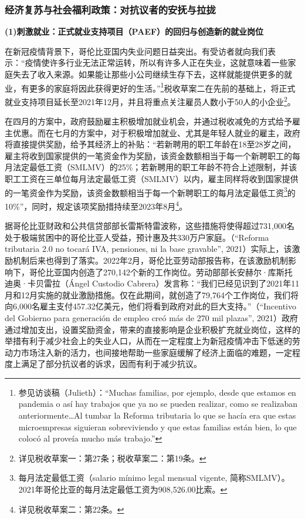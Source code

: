 \documentclass{phyasgn}\usepackage{nag}
\begin{document}
\subsubsection{经济复苏与社会福利政策：对抗议者的安抚与拉拢}
\textbf{(1)刺激就业：正式就业支持项目（PAEF）的回归与创造新的就业岗位}
\par 在新冠疫情背景下，哥伦比亚国内失业问题日益突出。有受访者就向我们表示：“疫情使许多行业无法正常运转，所以有许多人正在失业，这就意味着一些家庭失去了收入来源。如果能让那些小公司继续生存下去，这样就能提供更多的就业，有更多的家庭将因此获得更好的生活。”\footnote[29]{参见访谈稿（Julieth）：“Muchas familias, por ejemplo, desde que estamos en pandemia o así hay trabajos que ya no se pueden realizar, como se realizaban anteriormente…Al tumbar la Reforma tributaria lo que se hacía era que estas microempresas siguieran sobreviviendo y que estas familias están bien, lo que colocó al proveía mucho más trabajo.”}税收草案二在先前的基础上，将正式就业支持项目延长至2021年12月，并且将重点关注雇员人数小于50人的小企业\footnote[30]{详见税收草案一：第27条；税收草案二：第19条。}。
\par 在四月的方案中，政府鼓励雇主积极增加就业机会，并通过税收减免的方式给予雇主优惠。而在七月的方案中，对于积极增加就业、尤其是年轻人就业的雇主，政府将直接提供奖励，给予其经济上的补贴：“若新聘用的职工年龄在18至28岁之间，雇主将收到国家提供的一笔资金作为奖励，该资金数额相当于每一个新聘职工的每月法定最低工资（SMLMV）的25\%；若新聘用的职工年龄不符合上述限制，并该职工工资在三单位每月法定最低工资（SMLMV）以内，雇主同样将收到国家提供的一笔资金作为奖励，该资金数额相当于每一个新聘职工的每月法定最低工资\footnote[31]{每月法定最低工资（salario mínimo legal mensual vigente, 简称SMLMV）。2021年哥伦比亚的每月法定最低工资为908,526.00比索。}的10\%”，同时，规定该项奖励措持续至2023年8月\footnote[32]{详见税收草案二：第22条。}。
\par 据哥伦比亚财政和公共信贷部部长雷斯特雷波称，这些措施将使得超过731,000名处于极端贫困中的哥伦比亚人受益，预计惠及共330万户家庭。（“Reforma tributaria 2.0 no tocará IVA, pensiones, ni la base gravable”, 2021）实际上，该激励机制后来也得到了落实。2022年2月，哥伦比亚劳动部报告称，在该激励机制影响下，哥伦比亚国内创造了270,142个新的工作岗位。劳动部部长安赫尔·库斯托迪奥·卡贝雷拉（Ángel Custodio Cabrera）发言称：“我们已经见识到了2021年11月和12月实施的就业激励措施。仅在此期间，就创造了79,764个工作岗位，我们将向6,000名雇主支付457.32亿美元，他们将看到政府对此的巨大支持。”（“Incentivo del Gobierno para generación de empleo creó más de 270 mil plazas”, 2021）政府通过增加支出，设置奖励资金，带来的直接影响是企业积极扩充就业岗位，这样的举措有利于减少社会上的失业人口，从而在一定程度上为新冠疫情冲击下低迷的劳动力市场注入新的活力，也间接地帮助一些家庭缓解了经济上面临的难题，一定程度上满足了部分抗议者的诉求，因而有利于减少抗议。
\end{document}
